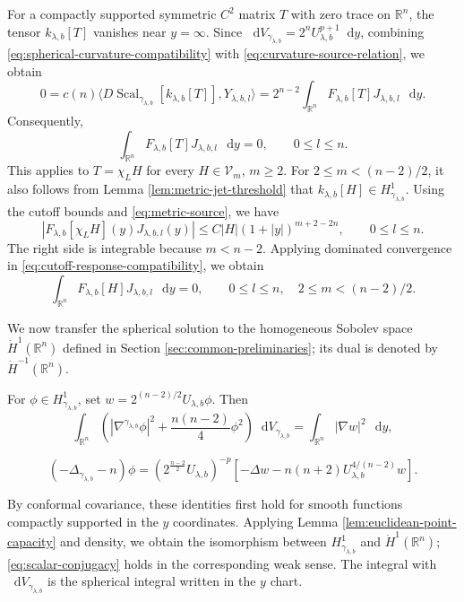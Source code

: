 \documentclass[11pt]{article}
\numberwithin{equation}{section}
\theoremstyle{remark}
\newcommand{\R}{\mathbb R}
\newcommand{\dd}{\mathop{}\!\mathrm{d}}
\begin{document}
For a compactly supported symmetric \(C^2\) matrix \(T\) with zero trace
on \(\R^n\), the tensor \(k_{\lambda,b}[T]\) vanishes near \(y=\infty\).
{Since
\(\dd V_{\gamma_{\lambda,b}}=2^nU_{\lambda,b}^{p+1}\dd y\), combining
\eqref{eq:spherical-curvature-compatibility} with
\eqref{eq:curvature-source-relation}, we obtain}
\[
 0=c(n)\langle D\!\operatorname{Scal}_{\gamma_{\lambda,b}}[k_{\lambda,b}[T]],
 Y_{\lambda,b,l}\rangle
 =2^{n-2}\int_{\R^n}F_{\lambda,b}[T]J_{\lambda,b,l}\,\dd y.
\]
Consequently,
\begin{equation}\label{eq:cutoff-response-compatibility}
 \int_{\R^n}F_{\lambda,b}[T]J_{\lambda,b,l}\,\dd y=0,
 \qquad 0\le l\le n.
\end{equation}
This applies to \(T=\chi_LH\) for every \(H\in\mathcal V_m\), \(m\ge2\).
{For \(2\le m<(n-2)/2\), it also follows from
Lemma  \ref{lem:metric-jet-threshold} that
\(k_{\lambda,b}[H]\in H^1_{\gamma_{\lambda,b}}\).}
{Using the cutoff bounds and \eqref{eq:metric-source}, we have}
\[
 |F_{\lambda,b}[\chi_LH](y)J_{\lambda,b,l}(y)|
 \le C|H|(1+|y|)^{m+2-2n},
 \qquad 0\le l\le n.
\]
The right side is integrable because \(m<n-2\).
{Applying dominated convergence in
\eqref{eq:cutoff-response-compatibility}, we obtain}
\[
 \int_{\R^n}F_{\lambda,b}[H]J_{\lambda,b,l}\,\dd y=0,
 \qquad 0\le l\le n,\quad 2\le m<(n-2)/2.
\]

We now transfer the spherical solution to the homogeneous Sobolev
space \(\dot H^1(\R^n)\) defined in
Section  \ref{sec:common-preliminaries}; its dual is denoted by
\(\dot H^{-1}(\R^n)\).

For \(\phi\in H^1_{\gamma_{\lambda,b}}\), {set
\(w=2^{(n-2)/2}U_{\lambda,b}\phi\).} Then
\begin{equation}\label{eq:conformal-energy}
 \int_{\R^n}\left(
 |\nabla^{\gamma_{\lambda,b}}\phi|^2
 +\frac{n(n-2)}4\phi^2
 \right)\dd V_{\gamma_{\lambda,b}}
 =\int_{\R^n}|\nabla w|^2\,\dd y,
\end{equation}

\begin{equation}\label{eq:scalar-conjugacy}
 (-\Delta_{\gamma_{\lambda,b}}-n)\phi
 =(2^{\frac{n-2}{2}}U_{\lambda,b})^{-p}
 \left[-\Delta w
 -n(n+2)U_{\lambda,b}^{4/(n-2)}w\right].
\end{equation}

{By conformal covariance, these identities first hold for
smooth functions compactly supported in the \(y\) coordinates. Applying
Lemma  \ref{lem:euclidean-point-capacity} and density, we obtain the
isomorphism between \(H^1_{\gamma_{\lambda,b}}\) and \(\dot H^1(\R^n)\);}
\eqref{eq:scalar-conjugacy} holds in the corresponding weak sense.
The integral with \(\dd V_{\gamma_{\lambda,b}}\) is the spherical integral
written in the \(y\) chart.
\end{document}

